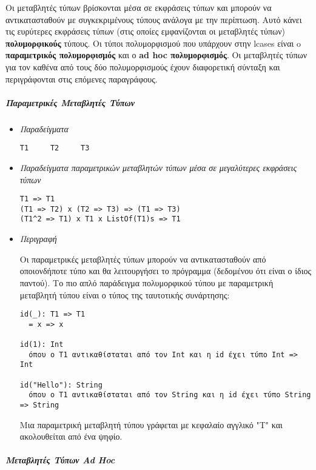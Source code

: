 \documentclass[diploma]{softlab-thesis}
\begin{document}
Οι μεταβλητές τύπων βρίσκονται μέσα σε εκφράσεις τύπων και μπορούν να
αντικατασταθούν με συγκεκριμένους τύπους ανάλογα με την περίπτωση. Αυτό
κάνει τις ευρύτερες εκφράσεις τύπων (στις οποίες εμφανίζονται οι μεταβλητές
τύπων) \textbf{πολυμορφικούς} τύπους. Οι τύποι πολυμορφισμού που υπάρχουν
στην lcases είναι o \textbf{παραμετρικός πολυμορφισμός} και ο \textbf{ad hoc
πολυμορφισμός}. Οι μεταβλητές τύπων για τον καθένα από τους δύο πολυμορφισμούς
έχουν διαφορετική σύνταξη και περιγράφονται στις επόμενες παραγράφους.

\subparagraph{Παραμετρικές Μεταβλητές Τύπων}

\begin{itemize}
\item \textit{Παραδείγματα}
\begin{verbatim}
T1     T2     T3
\end{verbatim}

\item
\textit{
Παραδείγματα παραμετρικών μεταβλητών τύπων μέσα σε μεγαλύτερες εκφράσεις
τύπων
}
\begin{verbatim}
T1 => T1
(T1 => T2) x (T2 => T3) => (T1 => T3)
(T1^2 => T1) x T1 x ListOf(T1)s => T1
\end{verbatim}

\item \textit{Περιγραφή}

Οι παραμετρικές μεταβλητές τύπων μπορούν να αντικατασταθούν από οποιονδήποτε
τύπο και θα λειτουργήσει το πρόγραμμα (δεδομένου ότι είναι ο ίδιος παντού). Το
πιο απλό παράδειγμα πολυμορφικού τύπου με παραμετρική μεταβλητή τύπου είναι ο
τύπος της ταυτοτικής συνάρτησης:
\begin{verbatim}
id(_): T1 => T1
  = x => x

id(1): Int
  όπου ο T1 αντικαθίσταται από τον Int και η id έχει τύπο Int => Int

id("Hello"): String
  όπου ο T1 αντικαθίσταται από τον String και η id έχει τύπο String => String
\end{verbatim}

Μια παραμετρική μεταβλητή τύπου γράφεται με κεφαλαίο αγγλικό "T" και
ακολουθείται από ένα ψηφίο.

\end{itemize}

\newpage
\subparagraph{Μεταβλητές Τύπων Ad Hoc}
\end{document}
